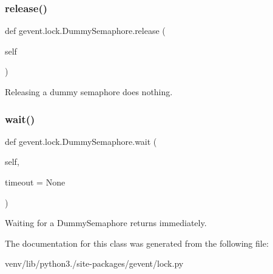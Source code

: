 \subsubsection{\texorpdfstring{release()}{release()}}
{\footnotesize\ttfamily def gevent.\+lock.\+Dummy\+Semaphore.\+release (\begin{DoxyParamCaption}\item[{}]{self }\end{DoxyParamCaption})}

\begin{DoxyVerb}Releasing a dummy semaphore does nothing.\end{DoxyVerb}
 \mbox{\label{classgevent_1_1lock_1_1_dummy_semaphore_a9c3fe3a91c10720b8eb75485ad9c9324}} 
\subsubsection{\texorpdfstring{wait()}{wait()}}
{\footnotesize\ttfamily def gevent.\+lock.\+Dummy\+Semaphore.\+wait (\begin{DoxyParamCaption}\item[{}]{self,  }\item[{}]{timeout = {\ttfamily None} }\end{DoxyParamCaption})}

\begin{DoxyVerb}Waiting for a DummySemaphore returns immediately.\end{DoxyVerb}
 

The documentation for this class was generated from the following file\+:\begin{DoxyCompactItemize}
\item 
venv/lib/python3./site-\/packages/gevent/lock.\+py\end{DoxyCompactItemize}
